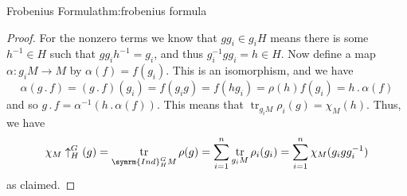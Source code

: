 \documentclass[fleqn]{NotesClass}
\newcommand{\action}{\mathbin{.}}
\DeclareMathOperator{\tr}{tr}
\newcommand{\Ind}{\symrm{Ind}}
\begin{document}
\begin{thm}{Frobenius Formula}{thm:frobenius formula}
\begin{proof}
            For the nonzero terms we know that \(gg_i \in g_iH\) means there is some \(h^{-1} \in H\) such that \(gg_ih^{-1} = g_i\), and thus \(g_i^{-1}gg_i = h \in H\).
            Now define a map \(\alpha \colon g_iM \to M\) by \(\alpha(f) = f(g_i)\).
            This is an isomorphism, and we have
            \begin{equation}
                \alpha(g \action f) = (g \action f)(g_i) = f(g_ig) = f(hg_i) = \rho(h)f(g_i) = h \action \alpha(f)
            \end{equation}
            and so \(g \action f = \alpha^{-1}(h \action \alpha(f))\).
            This means that \(\tr_{g_iM} \rho_i(g) = \chi_M(h)\).
            Thus, we have
            \begin{equation}
                \chi_M\uparrow^G_H(g) = \tr_{\Ind^G_H M} \rho(g) = \sum_{i=1}^n \tr_{g_i M} \rho_i(g_i) = \sum_{i=1}^n \chi_M(g_igg_i^{-1})
            \end{equation}
            as claimed.
        \end{proof}
    \end{thm}
    
\end{document}
